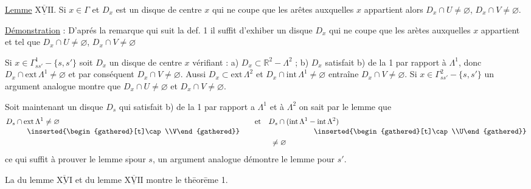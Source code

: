 \uline{Lemme} $\underline{\overline{\mathrm{XVII}}}$. Si $x\in\Gamma$ et $D_x$ est un disque de centre $x$ qui ne coupe que les arêtes auxquelles $x$ appartient alors $D_x\cap U\ne\varnothing$, $D_x\cap V\ne\varnothing$.

\uline{Démonstration} : D'aprés la remarque qui suit la def. 1 il suffit d'exhiber un disque $D_x$ qui ne coupe que les arètes auxquelles $x$ appartient et tel que $D_x\cap U\ne\varnothing$, $D_x\cap V\ne\varnothing$

Si $x\in\Gamma^{1}_{ss'}-\{s,s'\}$ soit $D_x$ un disque de centre $x$ vérifiant : a) $D_x\subset\mathbb{R}^{2}-\Lambda^{2}$ ; b) $D_x$ satisfait b) de la  1 par rapport à $\Lambda^{1}$, donc $D_x\cap\mathrm{ext}\,\Lambda^{1}\ne\varnothing$ et par conséquent $D_x\cap V\ne\varnothing$. Aussi $D_x\subset\mathrm{ext}\,\Lambda^{2}$ et $D_x\cap\mathrm{int}\,\Lambda^{1}\ne\varnothing$ entraîne $D_x\cap V\ne\varnothing$. Si $x\in\Gamma^{2}_{ss'}-\{s,s'\}$ un argument analogue montre que $D_x\cap U\ne\varnothing$ et $D_x\cap V\ne\varnothing$.

Soit maintenant un disque $D_s$ qui satisfait b) de la  1 par rapport a $\Lambda^{1}$ et à $\Lambda^{2}$ on sait par le lemme  que
\[
\begin{aligned}
D_s\cap{}&\mathrm{ext}\,\Lambda^{1}\ne\varnothing
  &\quad\text{et}\quad D_s\cap{}&(\mathrm{int}\,\Lambda^{1}-\mathrm{int}\,\Lambda^{2})\\[-.5ex]
 &\hphantom{\mathrm{e}}\inserted{\begin{gathered}[t]\cap\\V\end{gathered}}
  &\begin{gathered}[t]\vphantom{\cap}\\\ne\varnothing\end{gathered}
  &\hphantom{(\mathrm{int}\,\Lambda^{1}-}\inserted{\begin{gathered}[t]\cap\\U\end{gathered}}
\end{aligned}
\]
ce qui suffit à prouver le lemme s$\dot{\mathrm{p}}$our $s$, un argument analogue démontre le lemme pour $s'$.

La  du lemme $\underline{\overline{\mathrm{XVI}}}$ et du lemme $\underline{\overline{\mathrm{XVII}}}$ montre le thēorēme 1.

